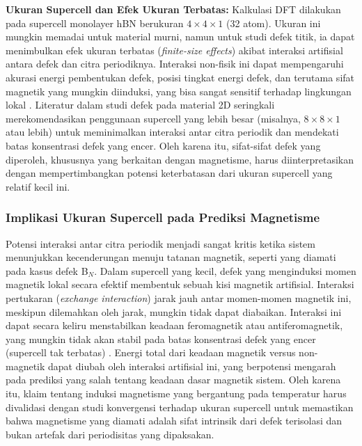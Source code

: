 \textbf{Ukuran Supercell dan Efek Ukuran Terbatas:} Kalkulasi DFT dilakukan pada supercell monolayer hBN berukuran $4 \times 4 \times 1$ (32 atom). Ukuran ini mungkin memadai untuk material murni, namun untuk studi defek titik, ia dapat menimbulkan efek ukuran terbatas (\textit{finite-size effects}) akibat interaksi artifisial antara defek dan citra periodiknya. Interaksi non-fisik ini dapat mempengaruhi akurasi energi pembentukan defek, posisi tingkat energi defek, dan terutama sifat magnetik yang mungkin diinduksi, yang bisa sangat sensitif terhadap lingkungan lokal \citep{Freysoldt2014}. Literatur dalam studi defek pada material 2D seringkali merekomendasikan penggunaan supercell yang lebih besar (misalnya, $8 \times 8 \times 1$ atau lebih) untuk meminimalkan interaksi antar citra periodik dan mendekati batas konsentrasi defek yang encer. Oleh karena itu, sifat-sifat defek yang diperoleh, khususnya yang berkaitan dengan magnetisme, harus diinterpretasikan dengan mempertimbangkan potensi keterbatasan dari ukuran supercell yang relatif kecil ini.

\subsubsection{Implikasi Ukuran Supercell pada Prediksi Magnetisme}
Potensi interaksi antar citra periodik menjadi sangat kritis ketika sistem menunjukkan kecenderungan menuju tatanan magnetik, seperti yang diamati pada kasus defek B$_N$. Dalam supercell yang kecil, defek yang menginduksi momen magnetik lokal secara efektif membentuk sebuah kisi magnetik artifisial. Interaksi pertukaran (\textit{exchange interaction}) jarak jauh antar momen-momen magnetik ini, meskipun dilemahkan oleh jarak, mungkin tidak dapat diabaikan. Interaksi ini dapat secara keliru menstabilkan keadaan feromagnetik atau antiferomagnetik, yang mungkin tidak akan stabil pada batas konsentrasi defek yang encer (supercell tak terbatas) \citep{Shishkin2007}. Energi total dari keadaan magnetik versus non-magnetik dapat diubah oleh interaksi artifisial ini, yang berpotensi mengarah pada prediksi yang salah tentang keadaan dasar magnetik sistem. Oleh karena itu, klaim tentang induksi magnetisme yang bergantung pada temperatur harus divalidasi dengan studi konvergensi terhadap ukuran supercell untuk memastikan bahwa magnetisme yang diamati adalah sifat intrinsik dari defek terisolasi dan bukan artefak dari periodisitas yang dipaksakan.

